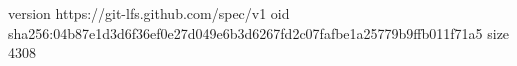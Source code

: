 version https://git-lfs.github.com/spec/v1
oid sha256:04b87e1d3d6f36ef0e27d049e6b3d6267fd2c07fafbe1a25779b9ffb011f71a5
size 4308
